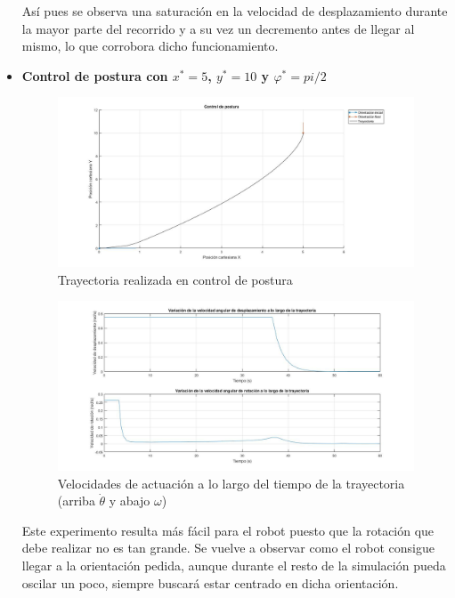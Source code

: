\documentclass[a4paper,twoside]{article}
\begin{document}
\begin{itemize}
		Así pues se observa una saturación en la velocidad de desplazamiento durante la mayor parte del recorrido y a su vez un decremento antes de llegar al mismo, lo que corrobora dicho funcionamiento.
		\newpage
		\item \textbf{Control de postura con $x^*=5$, $y^*=10$ y $\varphi^*=pi/2$}
		\begin{figure}[H]
			\centering
			\includegraphics[width=1\textwidth]{control_postura_2}
			\caption{Trayectoria realizada en control de postura}
		\end{figure}
		\begin{figure}[H]
			\centering
			\includegraphics[width=1\textwidth]{control_postura_2_2}
			\caption{Velocidades de actuación a lo largo del tiempo de la trayectoria (arriba $\dot{\theta}$ y abajo $\omega$)}
		\end{figure}
		Este experimento resulta más fácil para el robot puesto que la rotación que debe realizar no es tan grande. Se vuelve a observar como el robot consigue llegar a la orientación pedida, aunque durante el resto de la simulación pueda oscilar un poco, siempre buscará estar centrado en dicha orientación.
	\end{itemize}
	
\newpage
\end{document}
